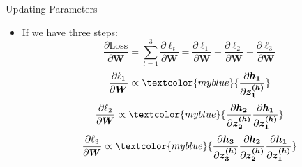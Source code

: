 \begin{frame}{Updating Parameters}
\centering
\begin{itemize}
    \item If we have  three steps: 
    \begin{equation*}
        \frac{\partial \text{Loss}}{ \partial \bm{W}} 
         = \sum_{t=1}^{3}   \frac{\partial \ell_t}{\partial \bm{W}} = \frac{\partial \ell_1}{\partial \bm{W}}  + \frac{\partial \ell_2}{\partial \bm{W}} + \frac{\partial \ell_3}{\partial \bm{W}}
    \end{equation*}
    \begin{equation*}
        \frac{\partial \ell_1}{\partial \bm{W}}  \propto   \textcolor{myblue}{\frac{\partial \bm{h_1}}{\partial \bm{z^{(h)}_1}}}
    \end{equation*}
    \begin{equation*}
    \frac{\partial \ell_2}{\partial \bm{W}}  \propto  
        \textcolor{myblue}{
        \frac{\partial \bm{h_2}}{\partial \bm{z^{(h)}_2}}\frac{\partial \bm{h_1}}{\partial \bm{z^{(h)}_1}}
        }
    \end{equation*}
    \begin{equation*}
    \frac{\partial \ell_3}{\partial \bm{W}}  \propto  
        \textcolor{myblue}{
        \frac{\partial \bm{h_3}}{\partial \bm{z^{(h)}_3}}\frac{\partial \bm{h_2}}{\partial \bm{z^{(h)}_2}}\frac{\partial \bm{h_1}}{\partial \bm{z^{(h)}_1}}
        }
    \end{equation*}     
\end{itemize}    
\end{frame}


